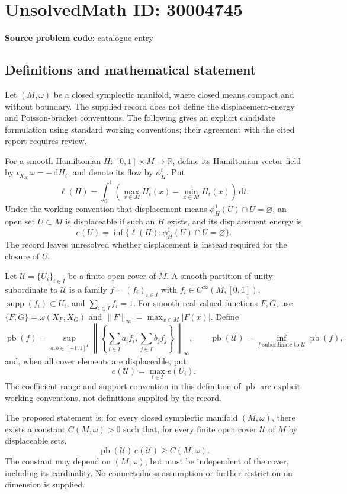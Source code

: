 \documentclass[11pt]{article}
\newcommand{\R}{\mathbb{R}}
\newcommand{\dd}{\,\mathrm{d}}
\begin{document}
\section*{UnsolvedMath ID: 30004745}
\textbf{Source problem code:} catalogue entry
\subsection{Definitions and mathematical statement}
Let \((M,\omega)\) be a closed symplectic manifold, where closed means compact and without boundary. The supplied record does not define the displacement-energy and Poisson-bracket conventions. The following gives an explicit candidate formulation using standard working conventions; their agreement with the cited report requires review.

For a smooth Hamiltonian \(H:[0,1]\times M\to\R\), define its Hamiltonian vector field by \(\iota_{X_{H_t}}\omega=-\dd H_t\), and denote its flow by \(\phi_H^t\). Put
\[
\ell(H)=\int_0^1\left(\max_{x\in M}H_t(x)-\min_{x\in M}H_t(x)\right)\dd t.
\]
Under the working convention that displacement means \(\phi_H^1(U)\cap U=\varnothing\), an open set \(U\subset M\) is displaceable if such an \(H\) exists, and its displacement energy is
\[
e(U)=\inf\{\ell(H):\phi_H^1(U)\cap U=\varnothing\}.
\]
The record leaves unresolved whether displacement is instead required for the closure of \(U\).

Let \(\mathcal U=\{U_i\}_{i\in I}\) be a finite open cover of \(M\). A smooth partition of unity subordinate to \(\mathcal U\) is a family \(f=(f_i)_{i\in I}\) with \(f_i\in C^\infty(M,[0,1])\), \(\operatorname{supp}(f_i)\subset U_i\), and \(\sum_{i\in I}f_i=1\). For smooth real-valued functions \(F,G\), use \(\{F,G\}=\omega(X_F,X_G)\) and \(\|F\|_\infty=\max_{x\in M}|F(x)|\). Define
\[
\operatorname{pb}(f)=\sup_{a,b\in[-1,1]^I}
\left\|\left\{\sum_{i\in I}a_i f_i,\sum_{j\in I}b_j f_j\right\}\right\|_\infty,
\qquad
\operatorname{pb}(\mathcal U)=\inf_{f\text{ subordinate to }\mathcal U}\operatorname{pb}(f),
\]
and, when all cover elements are displaceable, put
\[
e(\mathcal U)=\max_{i\in I}e(U_i).
\]
The coefficient range and support convention in this definition of \(\operatorname{pb}\) are explicit working conventions, not definitions supplied by the record.

The proposed statement is: for every closed symplectic manifold \((M,\omega)\), there exists a constant \(C(M,\omega)>0\) such that, for every finite open cover \(\mathcal U\) of \(M\) by displaceable sets,
\[
\operatorname{pb}(\mathcal U)\,e(\mathcal U)\geq C(M,\omega).
\]
The constant may depend on \((M,\omega)\), but must be independent of the cover, including its cardinality. No connectedness assumption or further restriction on dimension is supplied.
\end{document}
